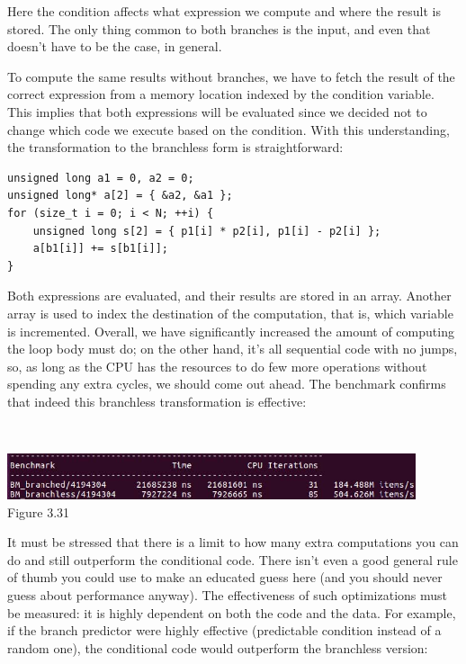 Here the condition affects what expression we compute and where the result is stored. The only thing common to both branches is the input, and even that doesn't have to be the case, in general.

To compute the same results without branches, we have to fetch the result of the correct expression from a memory location indexed by the condition variable. This implies that both expressions will be evaluated since we decided not to change which code we execute based on the condition. With this understanding, the transformation to the branchless form is straightforward:

\begin{lstlisting}[style=styleCXX]
unsigned long a1 = 0, a2 = 0;
unsigned long* a[2] = { &a2, &a1 };
for (size_t i = 0; i < N; ++i) {
	unsigned long s[2] = { p1[i] * p2[i], p1[i] - p2[i] };
	a[b1[i]] += s[b1[i]];
}
\end{lstlisting}

Both expressions are evaluated, and their results are stored in an array. Another array is used to index the destination of the computation, that is, which variable is incremented. Overall, we have significantly increased the amount of computing the loop body must do; on the other hand, it's all sequential code with no jumps, so, as long as the CPU has the resources to do few more operations without spending any extra cycles, we should come out ahead. The benchmark confirms that indeed this branchless transformation is effective:

\hspace*{\fill} \\ %
\begin{center}
\includegraphics[width=0.9\textwidth]{content/1/chapter3/images/31.jpg}\\
Figure 3.31
\end{center}

It must be stressed that there is a limit to how many extra computations you can do and still outperform the conditional code. There isn't even a good general rule of thumb you could use to make an educated guess here (and you should never guess about performance anyway). The effectiveness of such optimizations must be measured: it is highly dependent on both the code and the data. For example, if the branch predictor were highly effective (predictable condition instead of a random one), the conditional code would outperform the branchless version:

